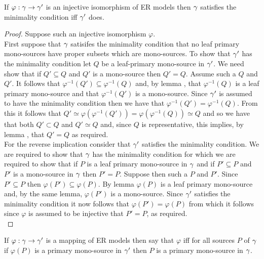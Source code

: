 \begin{lemma}
If $\varphi: \gamma \rightarrow \gamma'$ is an injective isomorphism of ER models then $\gamma$ satisfies the minimality condition iff $\gamma'$ does.
\end{lemma}
\begin{proof}
Suppose such an injective isomorphism $\varphi$. \\

First suppose that $\gamma$ satisifes the minimality condition that no leaf primary mono-sources have proper subsets which are mono-sources. 
To show that $\gamma'$ has the minimality condition let $Q$ be a leaf-primary mono-source in $\gamma'$. We need show that if $Q' \subseteq Q$ and $Q'$ is a mono-source then $Q'=Q$. Assume such a $Q$ and $Q'$. It follows that $\varphi^{-1}(Q') \subseteq \varphi^{-1} (Q)$ and, by lemma , that $\varphi^{-1}(Q)$
is a leaf primary mono-source and that $\varphi^{-1}(Q')$ is a mono-source. Since $\gamma'$ is assumed to have the minimality condition then we have that
$\varphi^{-1}(Q') = \varphi^{-1} (Q)$. From this it follows that  $Q' \simeq \varphi(\varphi^{-1}(Q')) = \varphi(\varphi^{-1}(Q)) \simeq Q$ and so we have that both $Q' \subset Q$ and $Q' \simeq Q$ and, since $Q$ is representative, this implies, by lemma , that $Q'=Q$ as required. \\

For the reverse implication consider that $\gamma'$ satisfies the minimality condition. We are required to show that $\gamma$ has the minimality condition for which we are required to show that if  $P$ is a leaf primary mono-source in $\gamma$ and if $P' \subseteq P$ and 
 $P'$ is a mono-source in $\gamma$ then $P'=P$.  Suppose then such a $P$ and $P'$. Since $P' \subseteq P$ then $\varphi(P') \subseteq \varphi(P)$. 
By lemma  $\varphi(P)$ is a leaf primary mono-source and, by the same lemma,  $\varphi(P')$ is a mono-source.
Since $\gamma'$ satisfies the minimality condition it now follows that $\varphi(P') = \varphi(P)$ from which  it follows since $\varphi$ is assumed to be injective
that $P'=P$, as required.\\
\end{proof}

\begin{definition}
If $\varphi: \gamma \rightarrow \gamma'$ is a mapping of ER models then
say that $\varphi$  
iff for all sources $P$ of  $\gamma$ if
$\varphi(P)$ is a primary mono-source in $\gamma'$ then $P$ is a primary mono-source in $\gamma$.
\end{definition}

